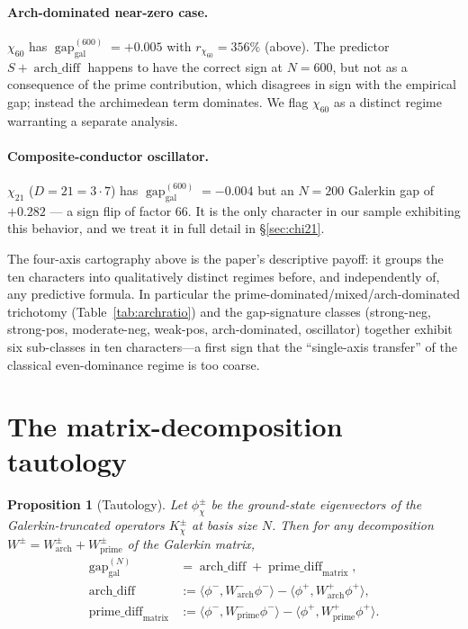 \documentclass[10pt,twocolumn]{article}
\newtheorem{proposition}[theorem]{Proposition}
\theoremstyle{definition}
\theoremstyle{remark}
\newcommand{\gap}{\operatorname{gap}}
\newcommand{\chifn}{\chi}
\newcommand{\archdiff}{\operatorname{arch\_diff}}
\newcommand{\primediff}{\operatorname{prime\_diff}_{\mathrm{matrix}}}
\begin{document}
\paragraph{Arch-dominated near-zero case.}
$\chifn_{60}$ has $\gap_{\mathrm{gal}}^{(600)}=+0.005$ with
$r_{\chifn_{60}}=356\%$ (above). The predictor $S+\archdiff$ happens
to have the correct sign at $N=600$, but not as a consequence of
the prime contribution, which disagrees in sign with the empirical
gap; instead the archimedean term dominates. We flag $\chifn_{60}$
as a distinct regime warranting a separate analysis.

\paragraph{Composite-conductor oscillator.}
$\chifn_{21}$ ($D=21=3\cdot 7$) has
$\gap_{\mathrm{gal}}^{(600)}=-0.004$ but an $N=200$ Galerkin gap of
$+0.282$ --- a sign flip of factor $66$. It is the only character in our sample exhibiting this
behavior, and we treat it in full detail in \S\ref{sec:chi21}.

\smallskip

The four-axis cartography above is the paper's descriptive payoff:
it groups the ten characters into qualitatively distinct regimes
before, and independently of, any predictive formula. In
particular the prime-dominated/mixed/arch-dominated trichotomy
(Table~\ref{tab:archratio}) and the gap-signature classes
(strong-neg, strong-pos, moderate-neg, weak-pos, arch-dominated,
oscillator) together exhibit six sub-classes in ten characters---a
first sign that the ``single-axis transfer'' of the classical
even-dominance regime \cite{RH_II} is too coarse.

\section{The matrix-decomposition tautology}
\label{sec:tautology}

\begin{proposition}[Tautology]
\label{prop:tautology}
Let $\phi^\pm_{\chifn}$ be the ground-state eigenvectors of the Galerkin-truncated
operators $K^\pm_{\chifn}$ at basis size $N$. Then for any decomposition
$W^\pm = W^\pm_{\mathrm{arch}} + W^\pm_{\mathrm{prime}}$ of the Galerkin matrix,
\[
\begin{aligned}
  \gap_{\mathrm{gal}}^{(N)}
    &= \archdiff + \primediff,\\
  \archdiff
    &:= \langle\phi^-, W^-_{\mathrm{arch}}\phi^-\rangle
      - \langle\phi^+, W^+_{\mathrm{arch}}\phi^+\rangle,\\
  \primediff
    &:= \langle\phi^-, W^-_{\mathrm{prime}}\phi^-\rangle
      - \langle\phi^+, W^+_{\mathrm{prime}}\phi^+\rangle.
\end{aligned}
\]
\end{proposition}
\end{document}
